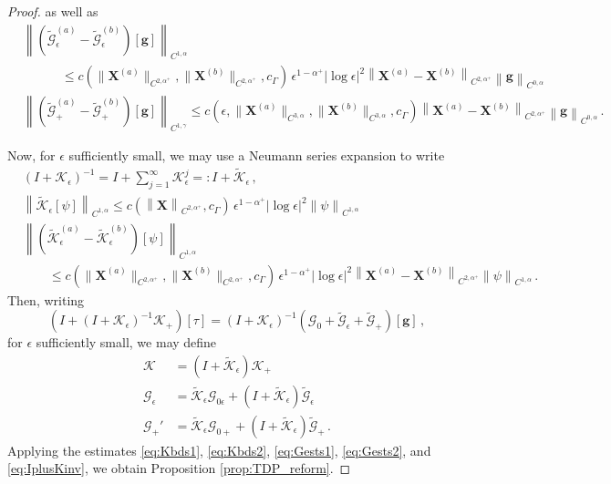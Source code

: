 \documentclass[11pt,reqno]{amsart}
\newcommand{\X}{\bm{X}}
\newcommand{\be}{\bm{e}}
\newcommand{\abs}[1]{\left\lvert #1 \right\rvert}
\newcommand{\norm}[1]{\left\lVert #1 \right\rVert}
\newcommand{\wt}[1]{\widetilde{#1}}
\newcommand{\mc}[1]{\mathcal{#1}}
\theoremstyle{definition}
\begin{document}
\begin{proof}
as well as 
\begin{equation}\label{eq:Gests2}
\begin{aligned}
  &\norm{(\wt{\mc{G}}_\epsilon^{(a)}-\wt{\mc{G}}_\epsilon^{(b)})[\bm{g}]}_{C^{1,\alpha}}\\
  &\quad\qquad\le c(\|\X^{(a)}\|_{C^{2,\alpha^+}},\|\X^{(b)}\|_{C^{2,\alpha^+}},c_\Gamma)\,\epsilon^{1-\alpha^+}\abs{\log\epsilon}^2\norm{\X^{(a)}-\X^{(b)}}_{C^{2,\alpha^+}}\norm{\bm{g}}_{C^{0,\alpha}}\\
  &\norm{(\wt{\mc{G}}_+^{(a)}-\wt{\mc{G}}_+^{(b)})[\bm{g}]}_{C^{1,\gamma}}\le c(\epsilon,\|\X^{(a)}\|_{C^{3,\alpha}},\|\X^{(b)}\|_{C^{3,\alpha}},c_\Gamma)\norm{\X^{(a)}-\X^{(b)}}_{C^{2,\alpha^+}}\norm{\bm{g}}_{C^{0,\alpha}}\,.
\end{aligned}
\end{equation}


Now, for $\epsilon$ sufficiently small, we may use a Neumann series expansion to write 
\begin{equation}\label{eq:IplusKinv}
\begin{aligned}
  &(I+\mc{K}_\epsilon)^{-1} = I+\sum_{j=1}^\infty \mc{K}_\epsilon^j=: I+\wt{\mc{K}}_\epsilon\,,\\
  &\norm{\wt{\mc{K}}_\epsilon[\psi]}_{C^{1,\alpha}}\le c(\norm{\X}_{C^{2,\alpha^+}},c_\Gamma)\,\epsilon^{1-\alpha^+}\abs{\log\epsilon}^2\norm{\psi}_{C^{1,\alpha}}\\
  &\norm{(\wt{\mc{K}}_\epsilon^{(a)}-\wt{\mc{K}}_\epsilon^{(b)})[\psi]}_{C^{1,\alpha}}\\
  &\qquad \le c(\|\X^{(a)}\|_{C^{2,\alpha^+}},\|\X^{(b)}\|_{C^{2,\alpha^+}},c_\Gamma)\,\epsilon^{1-\alpha^+}\abs{\log\epsilon}^2\norm{\X^{(a)}-\X^{(b)}}_{C^{2,\alpha^+}}\norm{\psi}_{C^{1,\alpha}}\,.
\end{aligned}
\end{equation}
%
%
%
Then, writing
\begin{equation}
  (I+ (I+\mc{K}_\epsilon)^{-1}\mc{K}_+)[\tau] = (I+\mc{K}_\epsilon)^{-1}(\mc{G}_0+\wt{\mc{G}}_\epsilon+\wt{\mc{G}}_+)[\bm{g}]\,,
\end{equation}
for $\epsilon$ sufficiently small, we may define
\begin{equation}
\begin{aligned}
  \mc{K} &= (I+\wt{\mc{K}}_\epsilon)\mc{K}_+ \\
  \mc{G}_\epsilon &= \wt{\mc{K}}_\epsilon\mc{G}_{0\epsilon} + (I+\wt{\mc{K}}_\epsilon)\wt{\mc{G}}_\epsilon\\
  \mc{G}_+' &= \wt{\mc{K}}_\epsilon\mc{G}_{0+} +(I+\wt{\mc{K}}_\epsilon)\wt{\mc{G}}_+\,.
\end{aligned}
\end{equation}
Applying the estimates \eqref{eq:Kbds1}, \eqref{eq:Kbds2}, \eqref{eq:Gests1}, \eqref{eq:Gests2}, and \eqref{eq:IplusKinv}, we obtain Proposition \ref{prop:TDP_reform}.
%
%
%
\end{proof}
\end{document}
